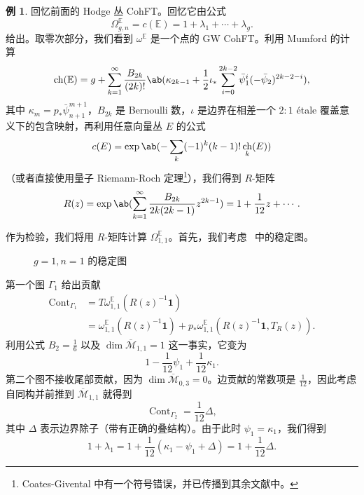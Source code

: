 \documentclass{amsart}
\theoremstyle{definition}
\newtheorem{exm}[thm]{例}
\theoremstyle{remark}
\theoremstyle{plain}
\theoremstyle{definition}
\theoremstyle{remark}
\newcommand{\E}{\mathbb{E}}
\newcommand{\Mbar}{\overline{\mathcal{M}}}
\newcommand{\1}{\mathbf{1}}
\newcommand{\2}{\mathbf{2}}
\newcommand{\3}{\mathbf{3}}
\DeclareMathOperator{\ch}{ch}
\DeclareMathOperator{\Cont}{Cont}
\begin{document}
\begin{exm}
    回忆前面的 Hodge 丛 CohFT。回忆它由公式
    \[ \Omega^{\E}_{g,n} = c(\E) = 1 + \lambda_1 + \cdots + \lambda_g. \]
    给出。取零次部分，我们看到 $\omega^{\E}$ 是一个点的 GW CohFT。利用 Mumford 的计算
    \[ \ch(\E) = g + \sum_{k=1}^{\infty} \frac{B_{2k}}{(2k)!}\ab(\kappa_{2k-1} + \frac{1}{2}\iota_*\sum_{i=0}^{2k-2} \bar{\psi}_1^{i} (-\bar{\psi}_2)^{2k-2-i}), \]
    其中 $\kappa_{m} = p_* \bar{\psi}_{n+1}^{m+1}$，$B_{2k}$ 是 Bernoulli 数，$\iota$ 是边界在相差一个 $2:1$ \'etale 覆盖意义下的包含映射，再利用任意向量丛 $E$ 的公式
    \[ c(E) = \exp \ab(-\sum_k (-1)^k (k-1)!\ch_k(E)) \]
    （或者直接使用量子 Riemann-Roch 定理\footnote{Coates-Givental 中有一个符号错误，并已传播到其余文献中。}），我们得到 $R$-矩阵
    \[ R(z) = \exp\ab( \sum_{k=1}^{\infty} \frac{B_{2k}}{2k(2k-1)} z^{2k-1}) = 1+\frac{1}{12}z + \cdots. \]

    作为检验，我们将用 $R$-矩阵计算 $\Omega_{1,1}^{\E}$。首先，我们考虑~ 中的稳定图。
    \begin{figure}[htpb]
    \begin{center}
    \end{center}
    \caption{$g=1, n=1$ 的稳定图}%
    \label{fig:03graphloop}
    \end{figure}
    第一个图 $\Gamma_1$ 给出贡献
    \begin{align*}
        \Cont_{\Gamma_1} &= T\omega_{1,1}^{\E}(R(z)^{-1}\1) \\
        &= \omega_{1,1}^{\E}(R(z)^{-1}\1) + p_* \omega_{1,1}^{\E}(R(z)^{-1}\1, T_R(z)).
    \end{align*}
    利用公式 $B_2 = \frac{1}{6}$ 以及 $\dim \Mbar_{1,1} = 1$ 这一事实，它变为
    \[ 1 - \frac{1}{12}\psi_1 + \frac{1}{12} \kappa_1. \]
    第二个图不接收尾部贡献，因为 $\dim \Mbar_{0,3} = 0$。边贡献的常数项是 $\frac{1}{12}$，因此考虑自同构并前推到 $\Mbar_{1,1}$ 就得到
    \[ \Cont_{\Gamma_2} = \frac{1}{12} \Delta, \]
    其中 $\Delta$ 表示边界除子（带有正确的叠结构）。由于此时 $\psi_1 = \kappa_1$，我们得到
    \[ 1+\lambda_1 = 1 + \frac{1}{12}(\kappa_1 - \psi_1 + \Delta) = 1 + \frac{1}{12} \Delta. \]
\end{exm}
\end{document}

